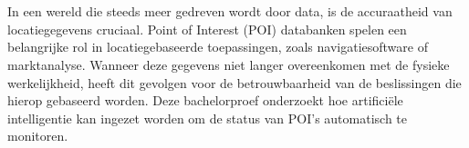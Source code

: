 
\chapter{}%
\label{ch:inleiding}



In een wereld die steeds meer gedreven wordt door data, is de accuraatheid van locatiegegevens cruciaal. Point of Interest (POI) databanken spelen een belangrijke rol in locatiegebaseerde toepassingen, zoals navigatiesoftware of marktanalyse. Wanneer deze gegevens niet langer overeenkomen met de fysieke werkelijkheid, heeft dit gevolgen voor de betrouwbaarheid van de beslissingen die hierop gebaseerd worden. Deze bachelorproef onderzoekt hoe artificiële 
intelligentie kan ingezet worden om de status van POI's automatisch te monitoren.

\section{}%
\label{sec:probleemstelling}


